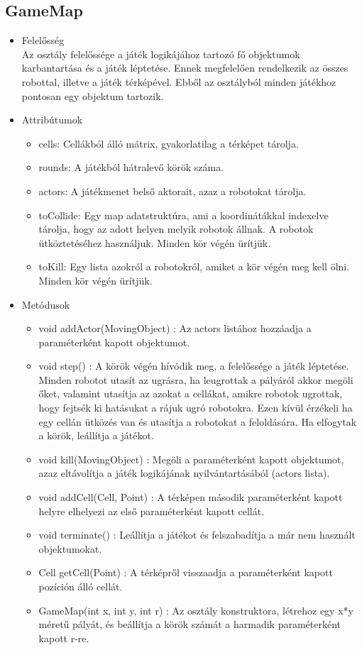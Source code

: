 \subsection{GameMap}
\begin{itemize}
\item Felelősség\\
Az osztály felelőssége a játék logikájához tartozó fő objektumok karbantartása és a játék léptetése. Ennek megfelelően rendelkezik az összes robottal, illetve a játék térképével. Ebből az osztályból minden játékhoz pontosan egy objektum tartozik.

\item Attribútumok
	\begin{itemize}
		\item cells: Cellákból álló mátrix, gyakorlatilag a térképet tárolja.
		\item rounds: A játékból hátralevő körök száma.
     	\item actors: A játékmenet belső aktorait, azaz a robotokat tárolja.
     	\item toCollide: Egy map adatstruktúra, ami a koordinátákkal indexelve tárolja, hogy az adott helyen melyik robotok állnak. A robotok ütköztetéséhez használjuk. Minden kör végén ürítjük.
     	\item toKill: Egy lista azokról a robotokról, amiket a kör végén meg kell ölni. Minden kör végén ürítjük.
	\end{itemize}
\item Metódusok
	\begin{itemize}
		\item void addActor(MovingObject) : Az actors listához hozzáadja a paraméterként kapott objektumot.
		\item void step() : A körök végén hívódik meg, a felelőssége a játék léptetése. Minden robotot utasít az ugrásra, ha leugrottak a pályáról akkor megöli őket, valamint utasítja az azokat a cellákat, amikre robotok ugrottak, hogy fejtsék ki hatásukat a rájuk ugró robotokra. Ezen kívül érzékeli ha egy cellán ütközés van és utasítja a robotokat a feloldására. Ha elfogytak a körök, leállítja a játékot.
		\item void kill(MovingObject) : Megöli a paraméterként kapott objektumot, azaz eltávolítja a játék logikájának nyilvántartásából (actors lista).
		\item void addCell(Cell, Point) : A térképen második paraméterként kapott helyre elhelyezi az első paraméterként kapott cellát.
		\item void terminate() : Leállítja a játékot és felszabadítja a már nem használt objektumokat.
		\item Cell getCell(Point) : A térképről visszaadja a paraméterként kapott pozíción álló cellát.
		\item GameMap(int x, int y, int r) : Az osztály konstruktora, létrehoz egy x*y méretű pályát, és beállítja a körök számát a harmadik paraméterként kapott r-re.
	\end{itemize}
\end{itemize}

